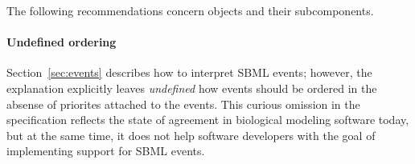 





The following recommendations concern \Event objects and their
subcomponents.


\paragraph{Undefined ordering}

Section~\ref{sec:events} describes how to interpret SBML events;
however, the explanation explicitly leaves \emph{undefined} how
events should be ordered in the absense of priorites attached to
the events.  This curious omission in the specification reflects
the state of agreement in biological modeling software today, but
at the same time, it does not help software developers with the
goal of implementing support for SBML events.


